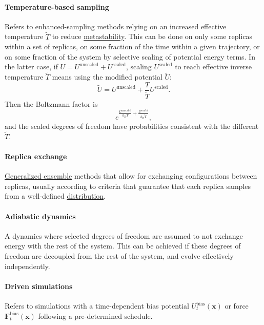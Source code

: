 \documentclass[9pt,review]{livecoms}
\newcommand{\vx}{\mathbf{x}}
\newcommand{\vF}{\mathbf{F}}
\begin{document}
\paragraph{Temperature-based sampling} Refers to enhanced-sampling methods relying on an increased effective temperature $\tilde T$ to reduce \hyperlink{ref:metastab} {metastability}. This can be done on only some replicas within a set of replicas, on some fraction of the time within a given trajectory, or on some fraction of the system by selective scaling of potential energy terms.
In the latter case, if $U = U^\mathrm{unscaled} + U^\mathrm{scaled}$, scaling $U^\mathrm{scaled}$ to reach effective inverse temperature $\tilde T$ means using the modified potential $\tilde U$:
\begin{equation}
\tilde U = U^\mathrm{unscaled} + \frac{T}{\tilde T} U^\mathrm{scaled}.
\end{equation}
Then the Boltzmann factor is
\begin{equation}
e^{\frac{U^\mathrm{unscaled}}{k_BT} + \frac{U^{scaled}}{k_B \tilde T}},
\end{equation}
and the scaled degrees of freedom have probabilities consistent with the different $\tilde T$.

\hypertarget{ref:ReplEx} {\paragraph{Replica exchange}} \hyperlink{ref:GenEns} {Generalized ensemble} methods that allow for exchanging configurations between replicas, usually according to criteria that guarantee that each replica samples from a well-defined \hyperlink{ref:Distribution} {distribution}.

\hypertarget{ref:AdiabaticDyn} {\paragraph{Adiabatic dynamics}}
A dynamics where selected degrees of freedom are assumed to not exchange energy with the rest of the system.
This can be achieved if these degrees of freedom are decoupled from the rest of the system, and evolve effectively independently.

\hypertarget{ref:Driven} {\paragraph{Driven simulations}} Refers to simulations with a time-dependent bias potential $U^{\mathrm{bias}}_t(\vx)$ or force $\vF^\mathrm{bias}_t(\vx)$ following a pre-determined schedule.
\end{document}
